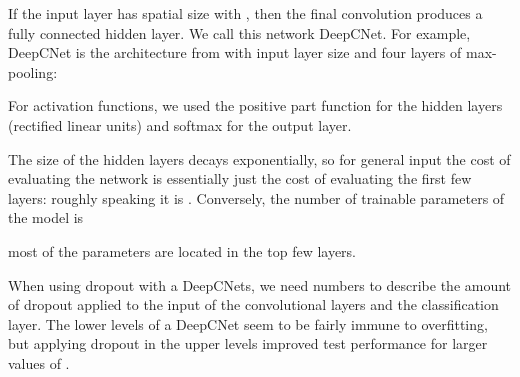 \documentclass{article}
\numberwithin{equation}{subsection}
\begin{document}
If the input layer has spatial size  with , then the final convolution produces a fully connected hidden layer.
We call this network DeepCNet.
For example, DeepCNet is the architecture from \cite{multicolumndeep} with input layer size  and four layers of max-pooling:

For activation functions, we used the positive part function  for the hidden layers (rectified linear units) and softmax for the output layer.

The size of the hidden layers decays exponentially, so for general input the cost of evaluating the network is essentially just the cost of evaluating the first few layers: roughly speaking it is . Conversely, the number of trainable parameters of the model is

most of the parameters are located in the top few layers.

When using dropout \cite{dropout} with a DeepCNets, we need  numbers to describe the amount of dropout applied to the input of the  convolutional layers and the classification layer. The lower levels of a DeepCNet seem to be fairly immune to overfitting, but applying dropout in the upper levels improved test performance for larger values of .
\end{document}
